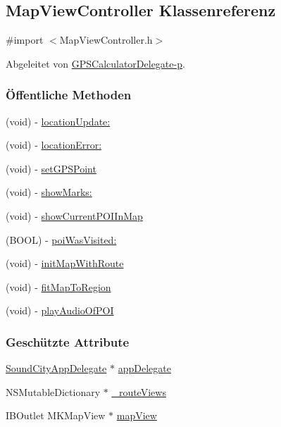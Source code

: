 \hypertarget{interface_map_view_controller}{
\subsection{MapViewController Klassenreferenz}
\label{interface_map_view_controller}
}


{\ttfamily \#import $<$MapViewController.h$>$}

Abgeleitet von \hyperlink{protocol_g_p_s_calculator_delegate-p}{GPSCalculatorDelegate-\/p}.\subsubsection*{Öffentliche Methoden}
\begin{DoxyCompactItemize}
\item 
(void) -\/ \hyperlink{interface_map_view_controller_ad3cf36d9e97a1a448f3cedb9a6d74d52}{locationUpdate:}
\item 
(void) -\/ \hyperlink{interface_map_view_controller_a76ee053461c5c2b8e7f1eb1a28e8d65b}{locationError:}
\item 
(void) -\/ \hyperlink{interface_map_view_controller_a95b915b0cb182a6117a9ee23f5b2ede8}{setGPSPoint}
\item 
(void) -\/ \hyperlink{interface_map_view_controller_a4c6506cd8c42f8da285f1c3a153a2d14}{showMarks:}
\item 
(void) -\/ \hyperlink{interface_map_view_controller_a41ee7e4c7e55bce32dccb93d128dc988}{showCurrentPOIInMap}
\item 
(BOOL) -\/ \hyperlink{interface_map_view_controller_aa06b8c96774de56d356c67bafb964ced}{poiWasVisited:}
\item 
(void) -\/ \hyperlink{interface_map_view_controller_ab13448226549116f45240b806aa00290}{initMapWithRoute}
\item 
(void) -\/ \hyperlink{interface_map_view_controller_a518a53d75a01058fcbb9f32362504103}{fitMapToRegion}
\item 
(void) -\/ \hyperlink{interface_map_view_controller_a9210c6dd6212d6c463f1ab56ca84b8b7}{playAudioOfPOI}
\end{DoxyCompactItemize}
\subsubsection*{Geschützte Attribute}
\begin{DoxyCompactItemize}
\item 
\hyperlink{interface_sound_city_app_delegate}{SoundCityAppDelegate} $\ast$ \hyperlink{interface_map_view_controller_a12d413910165fe7fd177ea75502be782}{appDelegate}
\item 
NSMutableDictionary $\ast$ \hyperlink{interface_map_view_controller_a9ea754eff3429ea0a98887f0bcb43eb8}{\_\-routeViews}
\item 
IBOutlet MKMapView $\ast$ \hyperlink{interface_map_view_controller_a5ae4cd29d4b84d9ed48341a58a2c0f4b}{mapView}
\end{DoxyCompactItemize}
